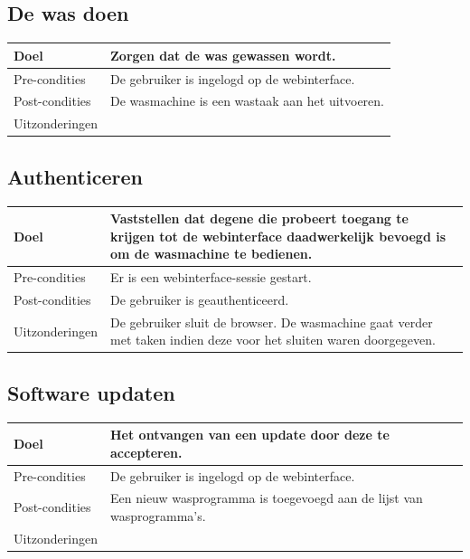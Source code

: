 	\subsection{De was doen}
	\begin{center}
	  \begin{tabular}{ | p{4cm} | p{8.5cm} | }    \hline
		Doel & Zorgen dat de was gewassen wordt. \\ \hline
		Pre-condities & De gebruiker is ingelogd op de webinterface. \\ \hline
		Post-condities & De wasmachine is een wastaak aan het uitvoeren. \\ \hline
		Uitzonderingen & \\
		\hline
	  \end{tabular}
	\end{center}

	\subsection{Authenticeren}
	\begin{center}
	  \begin{tabular}{ | p{4cm} | p{8.5cm} | } \hline
	  Doel & Vaststellen dat degene die probeert toegang te krijgen tot de webinterface daadwerkelijk bevoegd is om de wasmachine te bedienen. \\ \hline
	  Pre-condities & Er is een webinterface-sessie gestart.\\ \hline
	  Post-condities & De gebruiker is geauthenticeerd. \\ \hline
	  Uitzonderingen & De gebruiker sluit de browser. De wasmachine gaat verder met taken indien deze voor het sluiten waren doorgegeven. \\
	  \end{tabular}
	\end{center}

	\subsection{Software updaten}
	\begin{center}
	  \begin{tabular}{ | p{4cm} | p{8.5cm} | }    \hline
		Doel & Het ontvangen van een update door deze te accepteren. \\ \hline
		Pre-condities & De gebruiker is ingelogd op de webinterface. \\ \hline
		Post-condities & Een nieuw wasprogramma is toegevoegd aan de lijst van wasprogramma's. \\ \hline
		Uitzonderingen &  \\
		\hline
	  \end{tabular}
	\end{center}

